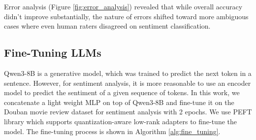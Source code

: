 \documentclass{article}
\begin{document}
Error analysis (Figure \ref{fig:error_analysis}) revealed that while overall accuracy didn't improve 
substantially, the nature of errors shifted toward more ambiguous cases where even human raters disagreed 
on sentiment classification.

\subsection{Fine-Tuning LLMs}
\label{ssec:fine_tuning}
Qwen3-8B is a generative model, which was trained to predict the next token in a sentence. However, for sentiment
analysis, it is more reasonable to use an encoder model to predict the sentiment of a given sequence of tokens.
In this work, we concatenate a light weight MLP on top of Qwen3-8B and fine-tune it on the 
Douban movie review dataset for sentiment analysis with 2 epochs. We use PEFT library \cite{Houlsby2019} which supports 
quantization-aware low-rank adapters \cite{Dettmers2023} to fine-tune the model.
The fine-tuning process is shown in Algorithm \ref{alg:fine_tuning}.
\end{document}
